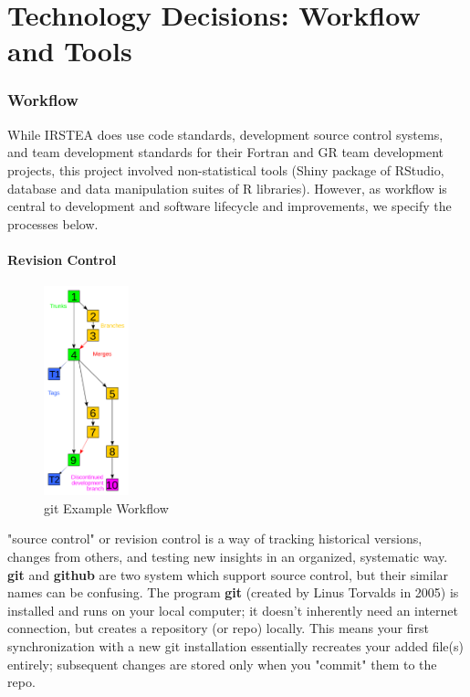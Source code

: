 \documentclass[logos,parttoc,morelanguage=french,morelanguage=german,draft]{orsay-memoire}
\begin{document}
\part{Technology Decisions: Workflow and Tools}

\section{Workflow}

While IRSTEA does use code standards, development source control systems, and team development standards for their Fortran and GR team development projects, this project involved non-statistical tools (Shiny package of RStudio, database and data manipulation suites of R libraries). However, as workflow is central to development and software lifecycle and improvements, we specify the processes below.

\subsection{Revision Control}

\begin{figure}
\centering
\includegraphics[width=0.22\textwidth]{images/440px-Revision_controlled_project_visualization-2010-24-02_svg.png}
  \caption{git Example Workflow}
  \label{fig:gitbranches}
\end{figure}

"\gls{source control}" or revision control is a way of tracking historical versions, changes from others, and testing new insights in an organized, systematic way. \textbf{git} and \textbf{github} are two system which support source control, but their similar names can be confusing. The program \textbf{git} (created by Linus Torvalds in 2005) is installed and runs on your local computer; it doesn't inherently need an internet connection, but creates a repository (or repo) locally. This means your first synchronization with a new git installation essentially recreates your added file(s) entirely; subsequent changes are stored only when you "commit" them to the repo.
\end{document}
